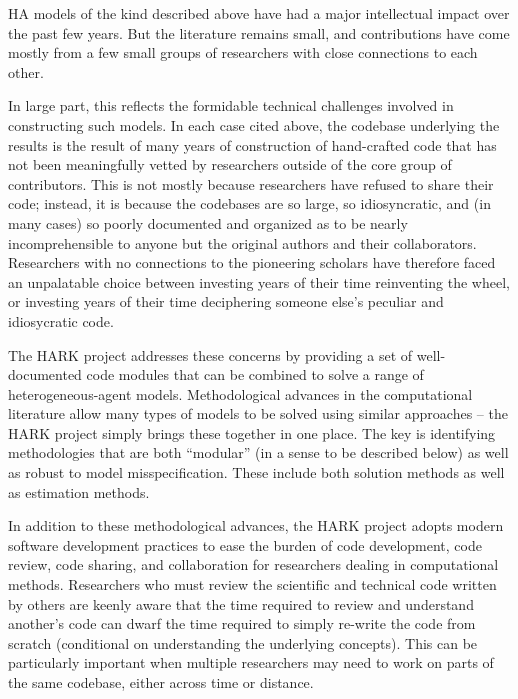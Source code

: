 \message{ !name(ccarroll_et_al_scipy_2018.tex)}\documentclass[10pt,twocolumn]{article}
\begin{document}
HA models of the kind described above have had a major intellectual impact over the past few years. But the literature remains small, and contributions have come mostly from a few small groups of researchers with close connections to each other.

In large part, this reflects the formidable technical challenges involved in constructing such models. In each case cited above, the codebase underlying the results is the result of many years of construction of hand-crafted code that has not been meaningfully vetted by researchers outside of the core group of contributors.  This is not mostly because researchers have refused to share their code; instead, it is because the codebases are so large, so idiosyncratic, and (in many cases) so poorly documented and organized as to be nearly incomprehensible to anyone but the original authors and their collaborators.  Researchers with no connections to the pioneering scholars have therefore faced an unpalatable choice between investing years of their time reinventing the wheel, or investing years of their time deciphering someone else's peculiar and idiosycratic code.

The HARK project addresses these concerns by providing a set of well-documented code modules that can be combined to solve a range of heterogeneous-agent models. Methodological advances in the computational literature allow many types of models to be solved using similar approaches -- the HARK project simply brings these together in one place. The key is identifying methodologies that are both ``modular'' (in a sense to be described below) as well as robust to model misspecification. These include both solution methods as well as estimation methods.

In addition to these methodological advances, the HARK project adopts modern software development practices to ease the burden of code development, code review, code sharing, and collaboration for researchers dealing in computational methods. Researchers who must review the scientific and technical code written by others are keenly aware that the time required to review and understand another's code can dwarf the time required to simply re-write the code from scratch (conditional on understanding the underlying concepts). This can be particularly important when multiple researchers may need to work on parts of the same codebase, either across time or distance.
\end{document}
